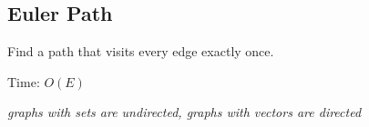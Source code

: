 \subsection{Euler Path}
Find a path that visits every edge exactly once.

Time: $O(E)$

\emph{\footnotesize graphs with sets are undirected, graphs with vectors are directed}
